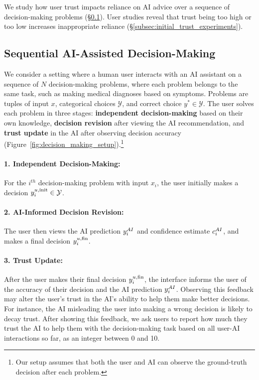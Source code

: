 We study how user trust impacts reliance on AI advice over a sequence of decision-making problems (\S\ref{subsec:ai_assisted_decision_making}). 
User studies reveal that trust being too high or too low increases inappropriate reliance (\S\ref{subsec:initial_trust_experiments}).

\subsection{Sequential AI-Assisted Decision-Making}
\label{subsec:ai_assisted_decision_making}

We consider a setting where a human user interacts with an AI assistant on a sequence of $N$ decision-making problems, where each problem belongs to the same task, such as making medical diagnoses based on symptoms. 
Problems are tuples of input $x$, categorical choices $\mathcal{Y}$, and correct choice $y^*\in\mathcal{Y}$. 
The user solves each problem in three stages: \textbf{independent decision-making} based on their own knowledge, \textbf{decision revision} after viewing the AI recommendation, and \textbf{trust update} in the AI after observing decision accuracy (Figure~\ref{fig:decision_making_setup}).\footnote{Our setup assumes that both the user and AI can observe the ground-truth decision after each problem.}

\paragraph{1. Independent Decision-Making:} 
For the $i^{th}$ decision-making problem with input $x_i$, the user initially makes a decision $y^{u,\text{init}}_i \in \mathcal{Y}$. 

\paragraph{2. AI-Informed Decision Revision:} The user then views the AI prediction $y^{AI}_i$ and confidence estimate $c^{AI}_i$, and makes a final decision $y^{u,\text{fin}}_i$.

\paragraph{3. Trust Update:} After the user makes their final decision $y^{u,\text{fin}}_i$, the interface informs the user of the accuracy of their decision and the AI prediction $y^{AI}_i$. 
Observing this feedback may alter the user's trust in the AI's ability to help them make better decisions. 
For instance, the AI misleading the user into making a wrong decision is likely to decay trust. 
After showing this feedback, we ask users to report how much they trust the AI to help them with the decision-making task based on all user-AI interactions so far, as an integer between 0 and 10.

